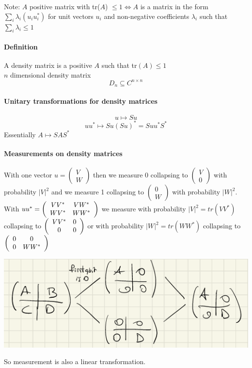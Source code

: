 \documentclass[10pt]{report}
\begin{document}
Note: $A$ positive matrix with tr($A$) $\leq 1\Leftrightarrow A$ is a matrix in the form $\sum_i \lambda_i(u_iu_i^*)$ for unit vectors $u_i$ and non-negative coefficients $\lambda_i$ such that $\sum_i \lambda_i \leq 1$
\paragraph{Definition} A density matrix is a positive $A$ such that tr$(A)\leq 1$\\
$n$ dimensional density matrix
$$D_n\subseteq C^{n\times n}$$
\paragraph{Unitary transformations for density matrices}
$$u\mapsto Su$$
$$uu^*\mapsto Su(Su)^* = Suu^*S^*$$
Essentially $A\mapsto SAS^*$
\paragraph{Measurements on density matrices} With one vector $u=\left(\begin{array}{c}
V\\W
\end{array}\right)$ then we measure 0 collapsing to $\left(\begin{array}{c}
V\\0
\end{array}\right)$ with probability $|V|^2$ and we measure 1 collapsing to $\left(\begin{array}{c}
0\\W
\end{array}\right)$ with probability $|W|^2$.\\
With $uu^* = \left(\begin{array}{c c}
VV^*&VW^*\\WV^*&WW^*
\end{array}\right)$ we measure with probability $|V|^2=tr(VV^*)$ collapsing to $\left(\begin{array}{c c}
VV^*&0\\0&0
\end{array}\right)$ or with probability $|W|^2=tr(WW^*)$ collapsing to $\left(\begin{array}{c c}
0&0\\0&WW^*
\end{array}\right)$
\begin{center}
	\includegraphics[scale=0.5]{43.png} %
\end{center}
So measurement is also a linear transformation.
\end{document}
